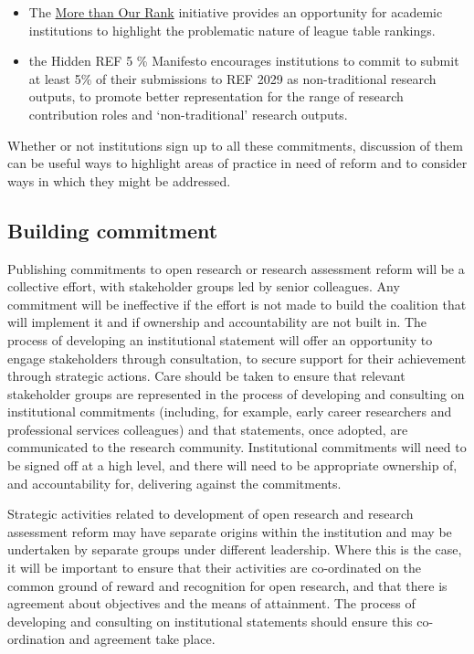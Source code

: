 \documentclass[
  letterpaper,
  DIV=11,
  numbers=noendperiod,
  oneside]{scrreprt}
\begin{document}
\begin{itemize}
\item
  The \href{https://inorms.net/more-than-our-rank/}{More than Our Rank}
  initiative provides an opportunity for academic institutions to
  highlight the problematic nature of league table rankings.
\item
  the Hidden REF 5 \% Manifesto encourages institutions to commit to
  submit at least 5\% of their submissions to REF 2029 as
  non-traditional research outputs, to promote better representation for
  the range of research contribution roles and `non-traditional'
  research outputs.
\end{itemize}

Whether or not institutions sign up to all these commitments, discussion
of them can be useful ways to highlight areas of practice in need of
reform and to consider ways in which they might be addressed.

\subsection{Building commitment}\label{building-commitment}

Publishing commitments to open research or research assessment reform
will be a collective effort, with stakeholder groups led by senior
colleagues. Any commitment will be ineffective if the effort is not made
to build the coalition that will implement it and if ownership and
accountability are not built in. The process of developing an
institutional statement will offer an opportunity to engage stakeholders
through consultation, to secure support for their achievement through
strategic actions. Care should be taken to ensure that relevant
stakeholder groups are represented in the process of developing and
consulting on institutional commitments (including, for example, early
career researchers and professional services colleagues) and that
statements, once adopted, are communicated to the research community.
Institutional commitments will need to be signed off at a high level,
and there will need to be appropriate ownership of, and accountability
for, delivering against the commitments.

Strategic activities related to development of open research and
research assessment reform may have separate origins within the
institution and may be undertaken by separate groups under different
leadership. Where this is the case, it will be important to ensure that
their activities are co-ordinated on the common ground of reward and
recognition for open research, and that there is agreement about
objectives and the means of attainment. The process of developing and
consulting on institutional statements should ensure this co-ordination
and agreement take place.
\end{document}

